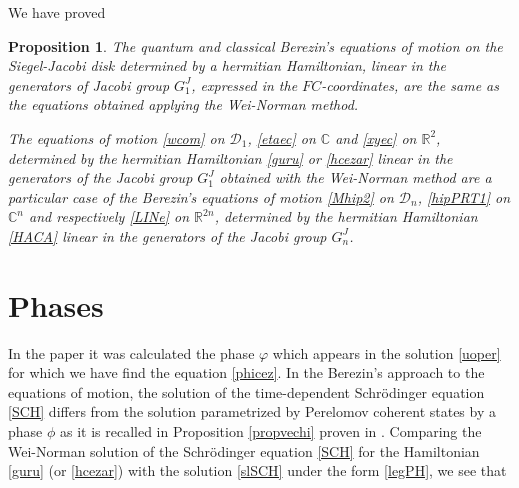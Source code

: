\documentclass[12pt]{amsart}
\numberwithin{equation}{section}
\newtheorem{Proposition}{Proposition}
\theoremstyle{definition}
\begin{document}
We have proved 
\begin{Proposition}\label{conc}The quantum and classical    Berezin's equations
  of motion on the Siegel-Jacobi disk
  determined by a  hermitian   Hamiltonian,  linear in the generators of
  Jacobi group  $G^J_1$,  expressed in the $FC$-coordinates,  are the same
  as the equations obtained applying the Wei-Norman method.

The equations of motion \eqref{wcom} on ${{\mathcal{{D}}}}_1$,
  \eqref{etaec} on ${\ensuremath{\mathbb{C}}}$  and \eqref{xyec} on ${\ensuremath{\mathbb{R}}}^2$,  determined by
 the  hermitian  Hamiltonian \eqref{guru} or \eqref{hcezar}  linear in  the generators of the Jacobi group $G^J_1$ obtained with the
  Wei-Norman method are a particular case of the Berezin's equations of motion
  \eqref{Mhip2} on ${{\mathcal{{D}}}}_n$, \eqref{hipPRT1} on ${\ensuremath{\mathbb{C}}}^n$ and
  respectively \eqref{LINe} on ${\ensuremath{\mathbb{R}}}^{2n}$,  determined by the 
  hermitian Hamiltonian \eqref{HACA} linear in the generators of the
  Jacobi group $G^J_n$. 
  

\end{Proposition}

\section{Phases}\label{PHP}
In the paper \cite{cezar} it was calculated the phase $\varphi$ which
appears  in the solution \eqref{uoper} for which we have find the
equation \eqref{phicez}. In the Berezin's approach to the equations of
motion, the solution of the time-dependent Schr\"odinger equation
\eqref{SCH}
differs from the solution parametrized by Perelomov coherent states by
a phase $\phi$ as it is recalled in  Proposition \ref{propvechi}
proven in \cite{sbcag,FC,nou}. 
Comparing the Wei-Norman solution of the Schr\"odinger equation
\eqref{SCH} for the Hamiltonian \eqref{guru}  (or \eqref{hcezar}) with
the solution \eqref{slSCH} under the form \eqref{legPH}, we see that
\end{document}
